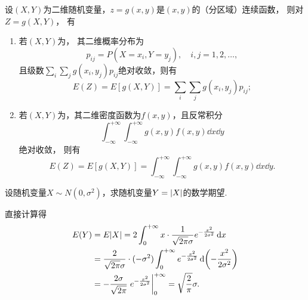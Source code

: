 \begin{theorem}\label{theorem:随机变量的数字特征.二维随机变量的函数的数学期望}
设\((X,Y)\)为二维随机变量，\(z=g(x,y)\)是\((x,y)\)的（分区域）连续函数，
则对\(Z=g(X,Y)\)，
有\begin{enumerate}
	\item 若\((X,Y)\)为，
	其二维概率分布为\begin{equation*}
		p_{ij} = P(X=x_i,Y=y_j), \quad i,j=1,2,\dotsc,
	\end{equation*}
	且级数\(\sum_i \sum_j g(x_i,y_j) p_{ij}\)绝对收敛，则有\begin{equation*}
		E(Z)
		= E[g(X,Y)]
		= \sum_i \sum_j g(x_i,y_j) p_{ij};
	\end{equation*}
	\item 若\((X,Y)\)为，其二维密度函数为\(f(x,y)\)，且反常积分\begin{equation*}
		\int_{-\infty}^{+\infty} \int_{-\infty}^{+\infty} g(x,y) f(x,y) \dd{x}\dd{y}
	\end{equation*}绝对收敛，
	则有\begin{equation*}
		E(Z)
		= E[g(X,Y)]
		= \int_{-\infty}^{+\infty} \int_{-\infty}^{+\infty} g(x,y) f(x,y) \dd{x}\dd{y}.
	\end{equation*}
\end{enumerate}
\end{theorem}

\begin{example}
设随机变量\(X \sim N(0,\sigma^2)\)，求随机变量\(Y = \abs{X}\)的数学期望.
\begin{solution}
直接计算得\begin{align*}
	E(Y) &= E\abs{X}
	= 2 \int_0^{+\infty} x \cdot \frac{1}{\sqrt{2 \pi} \sigma} e^{-\frac{x^2}{2\sigma^2}} \dd{x} \\
	&= \frac2{\sqrt{2 \pi} \sigma} \cdot (-\sigma^2) \int_0^{+\infty} e^{-\frac{x^2}{2\sigma^2}} \dd(-\frac{x^2}{2\sigma^2}) \\
	&= -\frac{2\sigma}{\sqrt{2\pi}} \eval{e^{-\frac{x^2}{2\sigma^2}}}_0^{+\infty}
	= \sqrt{\frac2\pi} \sigma.
\end{align*}
\end{solution}
\end{example}

